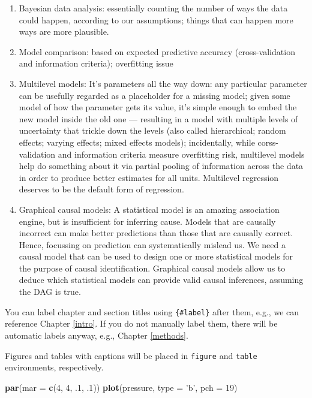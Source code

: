 \documentclass[
]{book}
\newenvironment{Shaded}{\begin{snugshade}}{\end{snugshade}}
\newcommand{\DataTypeTok}[1]{\textcolor[rgb]{0.13,0.29,0.53}{#1}}
\newcommand{\DecValTok}[1]{\textcolor[rgb]{0.00,0.00,0.81}{#1}}
\newcommand{\FloatTok}[1]{\textcolor[rgb]{0.00,0.00,0.81}{#1}}
\newcommand{\KeywordTok}[1]{\textcolor[rgb]{0.13,0.29,0.53}{\textbf{#1}}}
\newcommand{\NormalTok}[1]{#1}
\newcommand{\StringTok}[1]{\textcolor[rgb]{0.31,0.60,0.02}{#1}}
\providecommand{\tightlist}{%
  \setlength{\itemsep}{0pt}\setlength{\parskip}{0pt}}
\begin{document}
\begin{enumerate}
\def\labelenumi{\arabic{enumi}.}
\tightlist
\item
  Bayesian data analysis: essentially counting the number of ways the data could happen, according to our assumptions; things that can happen more ways are more plausible.
\item
  Model comparison: based on expected predictive accuracy (cross-validation and information criteria); overfitting issue
\item
  Multilevel models: It's parameters all the way down: any particular parameter can be usefully regarded as a placeholder for a missing model; given some model of how the parameter gets its value, it's simple enough to embed the new model inside the old one --- resulting in a model with multiple levels of uncertainty that trickle down the levels (also called hierarchical; random effects; varying effects; mixed effects models); incidentally, while corss-validation and information criteria measure overfitting risk, multilevel models help do something about it via partial pooling of information across the data in order to produce better estimates for all units. Multilevel regression deserves to be the default form of regression.
\item
  Graphical causal models: A statistical model is an amazing association engine, but is insufficient for inferring cause. Models that are causally incorrect can make better predictions than those that are causally correct. Hence, focussing on prediction can systematically mislead us. We need a causal model that can be used to design one or more statistical models for the purpose of causal identification. Graphical causal models allow us to deduce which statistical models can provide valid causal inferences, assuming the DAG is true.
\end{enumerate}

You can label chapter and section titles using \texttt{\{\#label\}} after them, e.g., we can reference Chapter \ref{intro}. If you do not manually label them, there will be automatic labels anyway, e.g., Chapter \ref{methods}.

Figures and tables with captions will be placed in \texttt{figure} and \texttt{table} environments, respectively.

\begin{Shaded}
\begin{Highlighting}[]
\KeywordTok{par}\NormalTok{(}\DataTypeTok{mar =} \KeywordTok{c}\NormalTok{(}\DecValTok{4}\NormalTok{, }\DecValTok{4}\NormalTok{, }\FloatTok{.1}\NormalTok{, }\FloatTok{.1}\NormalTok{))}
\KeywordTok{plot}\NormalTok{(pressure, }\DataTypeTok{type =} \StringTok{'b'}\NormalTok{, }\DataTypeTok{pch =} \DecValTok{19}\NormalTok{)}
\end{Highlighting}
\end{Shaded}
\end{document}
